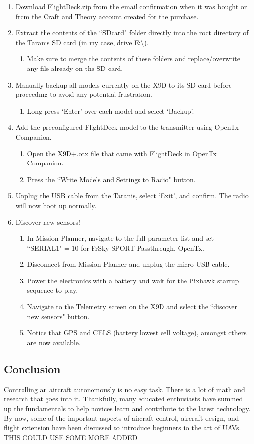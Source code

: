 \documentclass[12pt,journal,compsoc]{IEEEtran}
\begin{document}
\begin{enumerate}
\item Download FlightDeck.zip from the email confirmation when it was bought or from the Craft and Theory account created for the purchase.
\item Extract the contents of the ``SDcard" folder directly into the root directory of the Taranis SD card (in my case, drive E:\textbackslash).
	\begin{enumerate}
	\item Make sure to merge the contents of these folders and replace/overwrite any file already on the SD card.
	\end{enumerate}
\item Manually backup all models currently on the X9D to its SD card before proceeding to avoid any potential frustration.
	\begin{enumerate}
	\item Long press `Enter' over each model and select `Backup'.
	\end{enumerate}
\item Add the preconfigured FlightDeck model to the transmitter using OpenTx Companion.
	\begin{enumerate}
	\item Open the X9D+.otx file that came with FlightDeck in OpenTx Companion.
	\item Press the ``Write Models and Settings to Radio" button.
	\end{enumerate}
\item Unplug the USB cable from the Taranis, select `Exit', and confirm. The radio will now boot up normally.
\item Discover new sensors!
	\begin{enumerate}
	\item In Mission Planner, navigate to the full parameter list and set ``SERIAL1" = 10 for FrSky SPORT Passthrough, OpenTx.
	\item Disconnect from Mission Planner and unplug the micro USB cable.
	\item Power the electronics with a battery and wait for the Pixhawk startup sequence to play.
	\item Navigate to the Telemetry screen on the X9D and select the ``discover new sensors" button.
	\item Notice that GPS and CELS (battery lowest cell voltage), amongst others are now available.
	\end{enumerate}
\end{enumerate}

\subsection{Conclusion}
Controlling an aircraft autonomously is no easy task. There is a lot of math and research that goes into it. Thankfully, many educated enthusiasts have summed up the fundamentals to help novices learn and contribute to the latest technology. By now, some of the important aspects of aircraft control, aircraft design, and flight extension have been discussed to introduce beginners to the art of UAVs. THIS COULD USE SOME MORE ADDED
\end{document}
